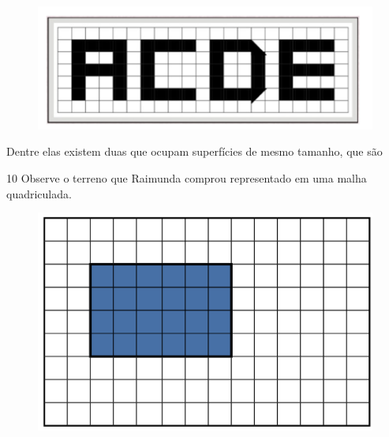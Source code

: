 \begin{figure}[htpb!]
\centering
\includegraphics[width=\textwidth]{./imgs/mat7.png}
\end{figure}

Dentre elas existem duas que ocupam superfícies de mesmo tamanho, que são


\pagebreak

\num{10} Observe o terreno que Raimunda comprou representado em uma malha
quadriculada.

\begin{figure}[htpb!]
\centering
\includegraphics[width=\textwidth]{../ilustracoes/MAT5/SAEB_5ANO_MAT_figura45.png}
\end{figure}

